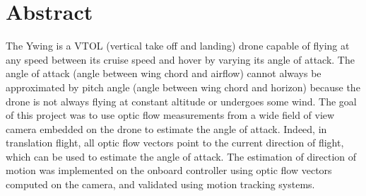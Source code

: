 \section*{Abstract}
The Ywing is a VTOL (vertical take off and landing) drone capable of flying at any speed between its cruise speed and hover by varying its angle of attack. The angle of attack (angle between wing chord and airflow) cannot always be approximated by pitch angle (angle between wing chord and horizon) because the drone is not always flying at constant altitude or undergoes some wind. The goal of this project was to use optic flow measurements from a wide field of view camera embedded on the drone to estimate the angle of attack. Indeed, in translation flight, all optic flow vectors point to the current direction of flight, which can be used to estimate the angle of attack. The estimation of direction of motion was implemented on the onboard controller using optic flow vectors computed on the camera, and validated using motion tracking systems.